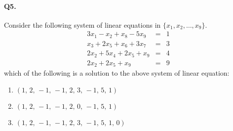 \documentclass[11pt]{article}
\begin{document}
\paragraph{Q5. } Consider the following system of linear equations in
\(\{x_1,x_2,\dots,x_9\}\).
\begin{eqnarray*}
3 x_{1} -  x_{2} + x_{8} - 5 x_{9} &=& 1
\\x_{3} + 2 x_{5} + x_{6} + 3 x_{7} &=& 3
\\2 x_{2} + 5 x_{4} + 2 x_{5} + x_{9} &=& 4
\\2 x_{2} + 2 x_{5} + x_{9} &=& 9
\end{eqnarray*}
which of the following is a solution to the above system of linear equation:
\begin{enumerate}
\item \(\left(1,\,2,\,-1,\,-1,\,2,\,3,\,-1,\,5,\,1\right)\)
\item \(\left(1,\,2,\,-1,\,-1,\,2,\,0,\,-1,\,5,\,1\right)\)
\item \(\left(1,\,2,\,-1,\,-1,\,2,\,3,\,-1,\,5,\,1,\, 0\right)\)
\end{enumerate}
\end{document}
